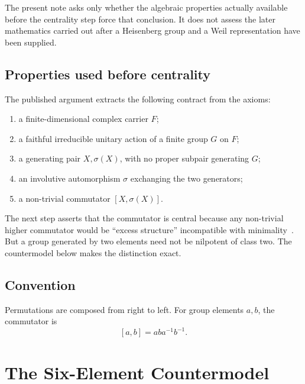 \documentclass[11pt,a4paper]{article}
\begin{document}
The present note asks only whether the algebraic properties actually available before the centrality step
force that conclusion.
It does not assess the later mathematics carried out after a Heisenberg group and a Weil representation
have been supplied.

\subsection{Properties used before centrality}

The published argument extracts the following contract from the axioms:

\begin{enumerate}
  \item a finite-dimensional complex carrier \(F\);
  \item a faithful irreducible unitary action of a finite group \(G\) on \(F\);
  \item a generating pair \(X,\sigma(X)\), with no proper subpair generating \(G\);
  \item an involutive automorphism \(\sigma\) exchanging the two generators;
  \item a non-trivial commutator \([X,\sigma(X)]\).
\end{enumerate}

The next step asserts that the commutator is central because any non-trivial higher commutator would be
``excess structure'' incompatible with minimality~\cite{Beau2026HeisenbergStructure}.
But a group generated by two elements need not be nilpotent of class two.
The countermodel below makes the distinction exact.

\subsection{Convention}

Permutations are composed from right to left.
For group elements \(a,b\), the commutator is
\[
[a,b]=aba^{-1}b^{-1}.
\]

\section{The Six-Element Countermodel}
\label{sec:countermodel}
\end{document}
